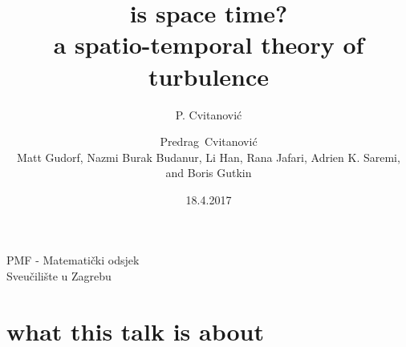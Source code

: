 


\usepackage[font=scriptsize, labelfont=bf]{caption}
\usepackage[
    backend=biber,  %
    sorting=nyt,
    style=numeric, %
    natbib=true,
    style=phys, %
    biblabel= brackets, %
    articletitle=false, %
    pageranges = true , %
    sortlocale=en_US,
    firstinits=true,
    url=false, %
    doi=false, %
    eprint=false
]{biblatex}



\renewcommand{\Ssym}[1]{{\ensuremath{m_{#1}}}}    %




\title{
{\huge is space time?}
    \\
{a spatio-temporal theory of turbulence}
}
\author{P. Cvitanovi\'c}
\author[Cvitanovi\'c]
{
  \textcolor{green!50!black}{
  {Predrag~Cvitanovi\'c \\
  Matt Gudorf,
  Nazmi Burak Budanur,
        Li Han,
        Rana Jafari,
		Adrien K. Saremi,
  and
  Boris Gutkin
  }	%
  }
}
\institute
{
PMF - Matematički odsjek\\
Sveučilište u Zagrebu
 }
\date{18.4.2017}

\begin{frame}
  \titlepage
\end{frame}


\section[what this talk is about]
 {what this talk is about}

